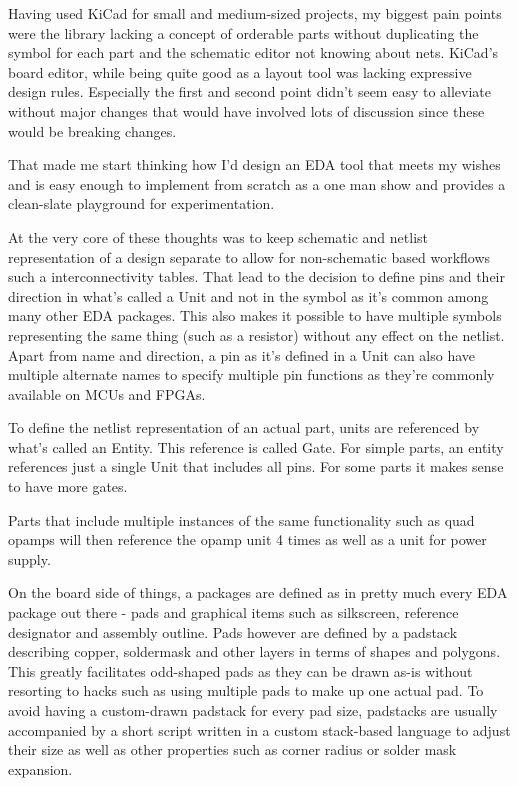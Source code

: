 \documentclass[letterpaper,10pt,czech]{sphinxmanual}
\begin{document}
Having used KiCad for small
and medium-sized projects, my biggest pain points were the library
lacking a concept of orderable parts without duplicating the symbol for
each part and the schematic editor not knowing about nets. KiCad’s board
editor, while being quite good as a layout tool was lacking expressive
design rules. Especially the first and second point didn’t seem easy to
alleviate without major changes that would have involved lots of
discussion since these would be breaking changes.

That made me start thinking how I’d design an EDA tool that meets my
wishes and is easy enough to implement from scratch as a one man show
and provides a clean-slate playground for experimentation.

At the very core of these thoughts was to keep schematic and netlist
representation of a design separate to allow for non-schematic based
workflows such a interconnectivity tables. That lead to the decision to
define pins and their direction in what’s called a Unit and not in the symbol as it’s common
among many other EDA packages. This also makes it possible to have
multiple symbols representing the same thing (such as a resistor)
without any effect on the netlist. Apart from name and direction, a pin
as it’s defined in a Unit can also have multiple alternate names to
specify multiple pin functions as they’re commonly available on MCUs
and FPGAs.

To define the netlist representation of an actual part, units are
referenced by what’s called an Entity. This reference is called Gate.
For simple parts, an entity references just a single Unit that includes
all pins. For some parts it makes sense to have more gates.

Parts that include multiple instances of the same functionality such as
quad opamps will then reference the opamp unit 4 times as well as a
unit for power supply.

On the board side of things, a packages are defined as in pretty much
every EDA package out there - pads and graphical items such as
silkscreen, reference designator and assembly outline. Pads however are
defined by a padstack describing copper, soldermask and other layers in
terms of shapes and polygons. This greatly facilitates odd-shaped pads
as they can be drawn as-is without resorting to hacks such as using
multiple pads to make up one actual pad. To avoid having a custom-drawn
padstack for every pad size, padstacks are usually accompanied by a
short script written in a custom stack-based language to adjust their
size as well as other properties such as corner radius or solder mask
expansion.
\end{document}
